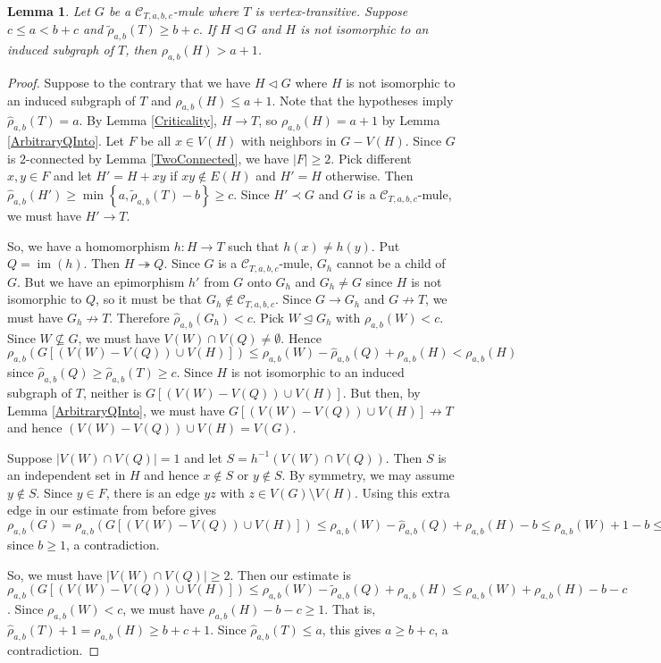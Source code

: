 \documentclass[12pt]{amsart}
\theoremstyle{plain}
\newtheorem{lem}[thm]{Lemma}
\theoremstyle{definition}
\theoremstyle{remark}
\newcommand{\fancy}[1]{\mathcal{#1}}
\newcommand{\C}{\fancy{C}}
\newcommand{\surj}{\twoheadrightarrow}
\newcommand{\set}[1]{\left\{ #1 \right\}}
\newcommand{\card}[1]{\left|#1\right|}
\newcommand{\func}[3]{#1\colon #2 \rightarrow #3}
\newcommand{\parens}[1]{\left( #1 \right)}
\newcommand{\brackets}[1]{\left[ #1 \right]}
\newcommand{\im}{\operatorname{im}}
\begin{document}
\begin{lem}\label{PlusOne}
Let $G$ be a $\C_{T,a,b,c}$-mule where $T$ is vertex-transitive. Suppose $c \le a < b + c$ and $\tilde{\rho}_{a,b}(T) \ge b + c$. If $H \lhd G$ and $H$ is not isomorphic to an induced subgraph of $T$, then $\rho_{a,b}(H) > a + 1$.
\end{lem}
\begin{proof}
Suppose to the contrary that we have $H \lhd G$ where $H$ is not isomorphic to an induced subgraph of $T$ and $\rho_{a,b}(H) \le a + 1$.  Note that the hypotheses imply $\hat{\rho}_{a,b}(T) = a$.  By Lemma \ref{Criticality}, $H \rightarrow T$, so $\rho_{a,b}(H) = a + 1$ by Lemma \ref{ArbitraryQInto}.  Let $F$ be all $x \in V(H)$ with neighbors in $G - V(H)$.  Since $G$ is $2$-connected by Lemma \ref{TwoConnected}, we have $|F| \ge 2$.  Pick different $x,y \in F$ and let $H' = H + xy$ if $xy \not \in E(H)$ and $H' = H$ otherwise.  Then $\hat{\rho}_{a,b}(H') \ge \min\set{a, \tilde{\rho}_{a,b}(T) - b} \ge c$.  Since $H' \prec G$ and $G$ is a $\C_{T,a,b,c}$-mule, we must have $H' \rightarrow T$.

So, we have a homomorphism $\func{h}{H}{T}$ such that $h(x) \ne h(y)$.  Put $Q = \im(h)$. Then $H \surj Q$. Since $G$ is a $\C_{T,a,b,c}$-mule, $G_h$ cannot be a child of $G$.  But we have an epimorphism $h'$ from $G$ onto $G_h$ and $G_h \ne G$ since $H$ is not isomorphic to $Q$, so it must be that $G_h \not \in \C_{T,a,b,c}$.  Since $G \rightarrow G_h$ and $G \not \rightarrow T$, we must have $G_h \not \rightarrow T$.  Therefore $\hat{\rho}_{a,b}(G_h) < c$.  Pick $W \unlhd G_h$ with $\rho_{a,b}(W) < c$.  Since $W \not \subseteq G$, we must have $V(W) \cap V(Q) \ne \emptyset$.  Hence $\rho_{a,b}\parens{G\brackets{(V(W) - V(Q)) \cup V(H)}} \le \rho_{a,b}(W) - \hat{\rho}_{a,b}(Q) + \rho_{a,b}(H) < \rho_{a,b}(H)$ since $\hat{\rho}_{a,b}(Q) \ge \hat{\rho}_{a,b}(T) \ge c$.  Since $H$ is not isomorphic to an induced subgraph of $T$, neither is $G\brackets{(V(W) - V(Q)) \cup V(H)}$.  But then, by Lemma \ref{ArbitraryQInto}, we must have $G\brackets{(V(W) - V(Q)) \cup V(H)} \not \rightarrow T$ and hence $(V(W) - V(Q)) \cup V(H) = V(G)$.

Suppose $\card{V(W) \cap V(Q)} = 1$ and let $S = h^{-1}(V(W) \cap V(Q))$. Then $S$ is an independent set in $H$ and hence $x \not \in S$ or $y \not \in S$.  By symmetry, we may assume $y \not \in S$.  Since $y \in F$, there is an edge $yz$ with $z \in V(G)\setminus V(H)$.  Using this extra edge in our estimate from before gives $\rho_{a,b}(G) = \rho_{a,b}\parens{G\brackets{(V(W) - V(Q)) \cup V(H)}} \le \rho_{a,b}(W) - \hat{\rho}_{a,b}(Q) + \rho_{a,b}(H) - b \le \rho_{a,b}(W) + 1 - b \le \rho_{a,b}(W) < c$ since $b \ge 1$, a contradiction.

So, we must have $\card{V(W) \cap V(Q)} \ge 2$.  Then our estimate is $\rho_{a,b}\parens{G\brackets{(V(W) - V(Q)) \cup V(H)}} \le \rho_{a,b}(W) - \tilde{\rho}_{a,b}(Q) + \rho_{a,b}(H) \le
\rho_{a,b}(W) + \rho_{a,b}(H) - b - c$.  Since $\rho_{a,b}(W) < c$, we must have $\rho_{a,b}(H) - b - c \ge 1$.  That is, $\hat{\rho}_{a,b}(T) + 1 = \rho_{a,b}(H) \ge b + c + 1$. Since $\hat{\rho}_{a,b}(T) \le a$, this gives $a \ge b + c$, a contradiction.
\end{proof}
\end{document}

